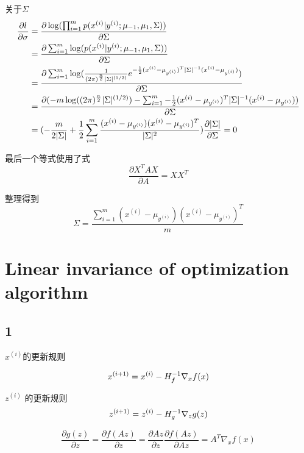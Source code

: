 \documentclass{ctexart}
\begin{document}
关于$\Sigma$
\begin{align*}
\frac{\partial l}{\partial \sigma} &= \frac{\partial \log(\prod_{i=1}^m p(x^{(i)}|y^{(i)};\mu_{-1},\mu_1,\Sigma))}{\partial \Sigma} \notag \\
&=  \frac{\partial \sum_{i=1}^m\log( p(x^{(i)}|y^{(i)};\mu_{-1},\mu_1,\Sigma))}{\partial \Sigma} \notag \\
&=  \frac{\partial \sum_{i=1}^m\log(\frac{1}{(2\pi)^{\frac{n}{2}}|\Sigma|^{(1/2)}}e^{-\frac{1}{2}(x^{(i)}-\mu_{y^{(i)}})^T |\Sigma|^{-1} (x^{(i)}-\mu_{y^{(i)}})})}{\partial \Sigma} \notag \\
&=  \frac{ \partial (-m\log((2\pi)^{\frac{n}{2}}|\Sigma|^{(1/2)}) -\sum_{i=1}^m -\frac{1}{2}(x^{(i)}-\mu_{y^{(i)}})^T |\Sigma|^{-1} (x^{(i)}-\mu_{y^{(i)}}))}{\partial \Sigma} \notag \\
&= (-\frac{m}{2|\Sigma|} + \frac{1}{2}\sum_{i=1}^m\frac{(x^{(i)} -\mu_{y^{(i)}})(x^{(i)} -\mu_{y^{(i)}})^T}{|\Sigma|^2})\frac{\partial |\Sigma|}{\partial \Sigma} = 0
\end{align*}

最后一个等式使用了式
\begin{equation*}
	\frac{\partial X^TAX}{\partial A} = XX^T
\end{equation*}

整理得到
\begin{equation}
\Sigma = \frac{\sum_{i=1}^m(x^{(i)} - \mu_{y^{(i)}})(x^{(i)} - \mu_{y^{(i)}})^T}{m}
\end{equation}

\section{Linear invariance of optimization algorithm}

\subsection{1}

$x^{(i)}$的更新规则

\begin{equation}
	x^{(i+1)} = x^{(i)} - H_f^{-1} \nabla_x f(x) \notag
\end{equation}

$z^{(i)}$ 的更新规则
\begin{equation}
	z^{(i+1)} = z^{(i)} - H_g^{-1} \nabla_z g(z)	\notag
\end{equation}

\begin{equation}
	\frac{\partial g(z)}{\partial z} = \frac{\partial f(Az)}{\partial z} = \frac{\partial Az}{\partial z} \frac{\partial f(Az)}{\partial Az} = A^T \nabla_x f(x)
\end{equation}
\end{document}

